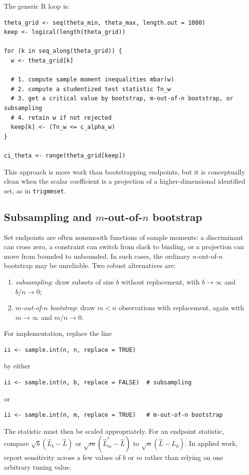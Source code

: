 \documentclass[11pt]{article}
\theoremstyle{plain}
\theoremstyle{definition}
\theoremstyle{remark}
\begin{document}
The generic R loop is:

\begin{verbatim}
theta_grid <- seq(theta_min, theta_max, length.out = 1000)
keep <- logical(length(theta_grid))

for (k in seq_along(theta_grid)) {
  w <- theta_grid[k]

  # 1. compute sample moment inequalities mbar(w)
  # 2. compute a studentized test statistic Tn_w
  # 3. get a critical value by bootstrap, m-out-of-n bootstrap, or subsampling
  # 4. retain w if not rejected
  keep[k] <- (Tn_w <= c_alpha_w)
}

ci_theta <- range(theta_grid[keep])
\end{verbatim}

This approach is more work than bootstrapping endpoints, but it is conceptually
clean when the scalar coefficient is a projection of a higher-dimensional
identified set, as in \texttt{trigmmset}.

\subsection{Subsampling and $m$-out-of-$n$ bootstrap}
\label{subsec:subsampling-m-out-n}

Set endpoints are often nonsmooth functions of sample moments: a discriminant
can cross zero, a constraint can switch from slack to binding, or a projection
can move from bounded to unbounded.  In such cases, the ordinary $n$-out-of-$n$
bootstrap may be unreliable.  Two robust alternatives are:
\begin{enumerate}
    \item \emph{subsampling}: draw subsets of size $b$ without replacement,
    with $b\to\infty$ and $b/n\to0$;
    \item \emph{$m$-out-of-$n$ bootstrap}: draw $m<n$ observations with
    replacement, again with $m\to\infty$ and $m/n\to0$.
\end{enumerate}
For implementation, replace the line
\begin{verbatim}
ii <- sample.int(n, n, replace = TRUE)
\end{verbatim}
by either
\begin{verbatim}
ii <- sample.int(n, b, replace = FALSE)  # subsampling
\end{verbatim}
or
\begin{verbatim}
ii <- sample.int(n, m, replace = TRUE)   # m-out-of-n bootstrap
\end{verbatim}
The statistic must then be scaled appropriately.  For an endpoint statistic,
compare $\sqrt b(\hat L_b-\hat L)$ or $\sqrt m(\hat L_m^*-\hat L)$ to
$\sqrt n(\hat L-L_0)$.  In applied work, report sensitivity across a few values
of $b$ or $m$ rather than relying on one arbitrary tuning value.
\end{document}
